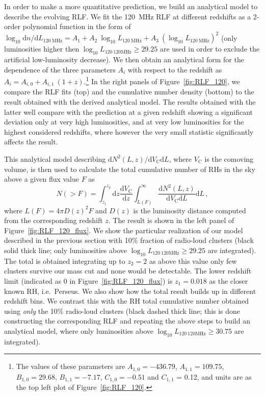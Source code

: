 \documentclass[traditabstract]{aa}
\newcommand{\rmn}{\mathrm}
\begin{document}
In order to make a more quantitative prediction, we build an analytical model to describe the evolving RLF. We fit the 120~MHz RLF at different redshifts as a 2-order polynomial function in the form of $\log_{10} \rmn{d}n/\rmn{d}L_{120~\rmn{MHz}} = A_{1} + A_{2}~\log_{10} L_{120~\rmn{MHz}} + A_{3}~(\log_{10} L_{120~\rmn{MHz}})^{2}$ (only luminosities higher then $\log_{10} L_{120~\rmn{120MHz}} \geq 29.25$ are used in order to exclude the artificial low-luminosity decrease). We then obtain an analytical form for the dependence of the three parameters $A_{i}$ with respect to the redshift as $A_{i} = A_{i,0} + A_{i,1}~(1+z)$.\footnote{The values of these parameters are $A_{1,0} = -436.79$, $A_{1,1} = 109.75$, $B_{1,0} = 29.68$, $B_{1,1} = -7.17$, $C_{1,0} = -0.51$ and $C_{1,1}$ = 0.12, and units are as the top left plot of Figure~\ref{fig:RLF_120}.} In the right panels of Figure~\ref{fig:RLF_120}, we compare the RLF fits (top) and the cumulative number density (bottom) to the result obtained with the derived analytical model. The results obtained with the latter well compare with the prediction at a given redshift showing a significant deviation only at very high luminosities, and at very low luminosities for the highest considered redshifts, where however the very small statistic significantly affects the result. 

This analytical model describing $\rmn{d}N^2(L,z)/\rmn{d}V_{\rmn{C}}\rmn{d}L$, where $V_{\rmn{C}}$ is the comoving volume, is then used to calculate the total cumulative number of RHs in the sky above a given flux value $F$ as
%
\begin{equation}
N(>F)  =  \int_{z_1}^{z_2} \rmn{d}z \frac{\rmn{d}V_{\rmn{C}}}{\rmn{d}z} \int_{L(F)}^{\infty} \frac{\rmn{d}N^2(L,z)}{\rmn{d}V_{\rmn{C}}\rmn{d}L} \rmn{d}L \, ,
\label{eq:NtotRH}
\end{equation}
%
where $L(F) = 4 \pi D(z)^2 F$ and $D(z)$ is the luminosity distance computed from the corresponding redshift $z$.
The result is shown in the left panel of Figure~\ref{fig:RLF_120_flux}. We show the particular realization of our model described in the previous section with 10\% fraction of radio-loud clusters (black solid thick line; only luminosities above $\log_{10} L_{120~\rmn{120MHz}} \geq 29.25$ are integrated). The total is obtained integrating up to $z_{2} = 2$ as above this value only few clusters survive our mass cut and none would be detectable. The lower redshift limit (indicated as 0 in Figure~\ref{fig:RLF_120_flux}) is $z_{1} = 0.018$ as the closer known RH, i.e.~Perseus. We also show how the total result builds up in different redshift bins. We contrast this with the RH total cumulative number obtained using \emph{only} the 10\% radio-loud clusters (black dashed thick line; this is done constructing the corresponding RLF and repeating the above steps to build an analytical model, where only luminosities above $\log_{10} L_{120~\rmn{120MHz}} \geq 30.75$ are integrated). 
\end{document}
